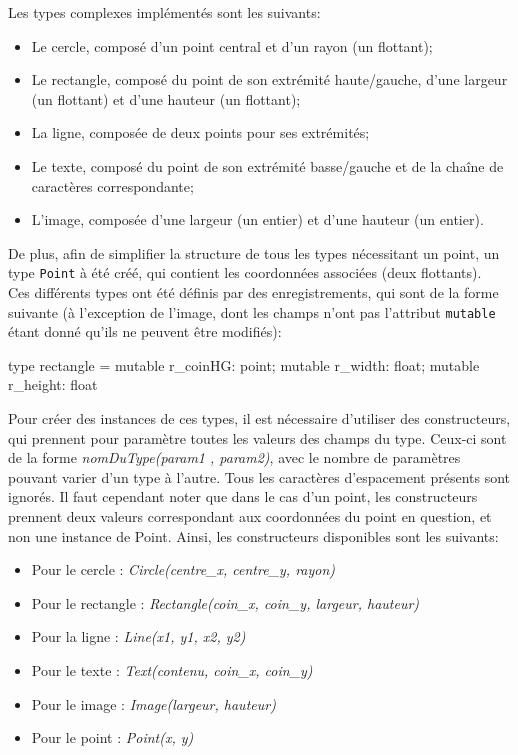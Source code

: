 \documentclass[a4paper, 12pt]{report}
\begin{document}
	Les types complexes implémentés sont les suivants:\\
	
	\begin{itemize}
		\item Le cercle, composé d'un point central et d'un rayon (un flottant);
		\item Le rectangle, composé du point de son extrémité haute/gauche, d'une largeur (un flottant) et d'une hauteur (un flottant);
		\item La ligne, composée de deux points pour ses extrémités;
		\item Le texte, composé du point de son extrémité basse/gauche et de la cha\^ine de caractères correspondante;
		\item L'image, composée d'une largeur (un entier) et d'une hauteur (un entier).\\
	\end{itemize}
	
	De plus, afin de simplifier la structure de tous les types nécessitant un point, un type \texttt{Point} à été créé, qui contient les coordonnées associées (deux flottants).\\
	
	Ces différents types ont été définis par des enregistrements, qui sont de la forme suivante (à l'exception de l'image, dont les champs n'ont pas l'attribut \texttt{mutable} étant donné qu'ils ne peuvent être modifiés):\\
	
	\begin{verbatimtab}[4]
	type rectangle = {
		mutable r_coinHG: point;
		mutable r_width: float;
		mutable r_height: float
	}
	\end{verbatimtab}
	
	Pour créer des instances de ces types, il est nécessaire d'utiliser des constructeurs, qui prennent pour paramètre toutes les valeurs des champs du type. Ceux-ci sont de la forme \textit{nomDuType(param1 , param2)}, avec le nombre de paramètres pouvant varier d'un type à l'autre. Tous les caractères d'espacement présents sont ignorés. Il faut cependant noter que dans le cas d'un point, les constructeurs prennent deux valeurs correspondant aux coordonnées du point en question, et non une instance de Point. Ainsi, les constructeurs disponibles sont les suivants:\\
	
	\begin{itemize}
		\item Pour le cercle : \textit{Circle(centre\_x, centre\_y, rayon)}
		\item Pour le rectangle : \textit{Rectangle(coin\_x, coin\_y, largeur, hauteur)}
		\item Pour la ligne : \textit{Line(x1, y1, x2, y2)}
		\item Pour le texte : \textit{Text(contenu, coin\_x, coin\_y)}
		\item Pour le image : \textit{Image(largeur, hauteur)}
		\item Pour le point : \textit{Point(x, y)}\\
	\end{itemize}
	
\end{document}
